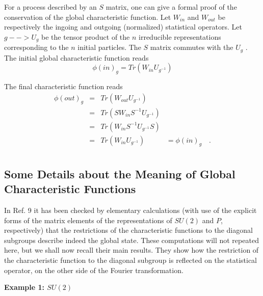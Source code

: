 \documentclass[a4paper,11pt]{article}
\newcounter{num}
\begin{document}
For a process described by an $S$ matrix, one can give a formal proof of the conservation of 
the global characteristic function. Let $W_{in}$ and $W_{out}$ be respectively the ingoing and 
outgoing 
(normalized) statistical operators. Let $g-->U_g$ be the tensor product of the $n$ irreducible 
representations corresponding to the $n$ initial particles. The $S$ matrix commutes with the 
$U_g$ . The initial global characteristic function reads
$$
    \phi(in)_g = Tr(W_{in} U_{g^{-1}})
$$

The final characteristic function reads
\begin{equation}
 \begin{array}{llll}
 \nonumber
 \phi(out)_g &=& Tr(W_{out}U_{g^{-1}})& \\
             &=& Tr(SW_{in} S^{-1} U_{g^{-1}}) & \\
             &=& Tr(W_{in} S^{-1} U_{g^{-1}} S) & \\
             &=& Tr(W_{in} U_{g^{-1}})         &= \phi(in)_g  \quad . \\
 \end{array}
\end{equation}

\subsection{Some Details about the Meaning of Global Characteristic Functions}

In Ref. 9 it has been checked by elementary calculations (with use of the explicit forms of the 
matrix elements of the representations of $SU(2)$ and $P$, respectively) that the restrictions 
of 
the characteristic functions to the diagonal subgroups describe indeed the global state. These 
computations will not repeated here, but we shall now recall their main results. They show how 
the restriction of the characteristic function to the diagonal subgroup is reflected on the 
statistical operator, on the other side of the Fourier transformation. 

{\bf Example 1: $SU(2)$}
\end{document}
